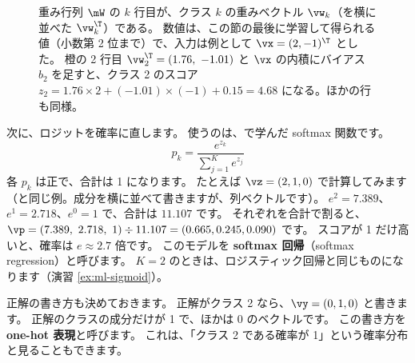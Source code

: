 \begin{figure}[tbp]
\centering
{}
\caption{重み行列 $\mW$ の $k$ 行目が、クラス $k$ の重みベクトル $\vw_k$（を横に並べた $\vw_k^\T$）である。
数値は、この節の最後に学習して得られる値（小数第 2 位まで）で、入力は例として $\vx=(2,-1)^\T$ とした。
橙の 2 行目 $\vw_2^\T=(1.76,\ -1.01)$ と $\vx$ の内積にバイアス $b_2$ を足すと、クラス 2 のスコア $z_2=1.76\times 2+(-1.01)\times(-1)+0.15=4.68$ になる。ほかの行も同様。}
\label{fig:ml-weight-rows}
\end{figure}

次に、ロジットを確率に直します。
使うのは、で学んだ softmax 関数です。
\begin{equation}
p_k = \frac{e^{z_k}}{\sum_{j=1}^{K} e^{z_j}}
\label{eq:ml-softmax}
\end{equation}
各 $p_k$ は正で、合計は 1 になります。
たとえば $\vz=(2,1,0)$ で計算してみます（と同じ例。成分を横に並べて書きますが、列ベクトルです）。
$e^2=7.389$、$e^1=2.718$、$e^0=1$ で、合計は $11.107$ です。
それぞれを合計で割ると、$\vp=(7.389,\ 2.718,\ 1)\div 11.107=(0.665, 0.245, 0.090)$ です。
スコアが 1 だけ高いと、確率は $e\approx2.7$ 倍です。
このモデルを \textbf{softmax 回帰}（softmax regression）と呼びます。
$K=2$ のときは、ロジスティック回帰と同じものになります（演習 \ref{ex:ml-sigmoid}）。

正解の書き方も決めておきます。
正解がクラス 2 なら、$\vy=(0,1,0)$ と書きます。
正解のクラスの成分だけが 1 で、ほかは 0 のベクトルです。
この書き方を \textbf{one-hot 表現}と呼びます。
これは、「クラス 2 である確率が 1」という確率分布と見ることもできます。

